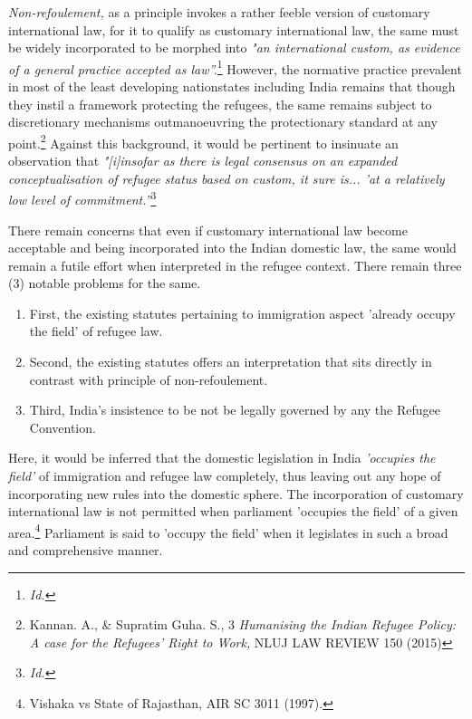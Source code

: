 \begin{multicols}{2}
\noi
\textit{Non-refoulement,} as a principle invokes a rather feeble version of customary international
law, for it to qualify as customary international law, the same must be widely incorporated to
be morphed into \textit{"an international custom, as evidence of a general practice accepted as
law”.}\footnote{\textit{Id.}} However, the normative practice prevalent in most of the least developing nationstates including India remains that though they instil a framework protecting the refugees, the
same remains subject to discretionary mechanisms outmanoeuvring the protectionary
standard at any point.\footnote{Kannan. A., \& Supratim Guha. S., 3 \textit{Humanising the Indian Refugee Policy: A case for the Refugees’ Right to Work,} NLUJ LAW REVIEW 150 (2015)} Against this background, it would be pertinent to insinuate an observation that \textit{"[i]insofar as there is legal consensus on an expanded conceptualisation of
refugee status based on custom, it sure is... 'at a relatively low level of commitment.”}\footnote{\textit{Id.}}


\noi
There remain concerns that even if customary international law become acceptable and being
incorporated into the Indian domestic law, the same would remain a futile effort when
interpreted in the refugee context. There remain three (3) notable problems for the same.

\begin{enumerate}[label=$\bullet$]
\item First, the existing statutes pertaining to immigration aspect 'already occupy the field'
of refugee law.

\item Second, the existing statutes offers an interpretation that sits directly in contrast with
principle of non-refoulement.

\item Third, India’s insistence to be not be legally governed by any the Refugee
Convention.
\end{enumerate}

\noi
Here, it would be inferred that the domestic legislation in India \textit{'occupies the field'} of
immigration and refugee law completely, thus leaving out any hope of incorporating new
rules into the domestic sphere. The incorporation of customary international law is not
permitted when parliament 'occupies the field' of a given area.\footnote{Vishaka vs State of Rajasthan, AIR SC 3011 (1997).} Parliament is said to 'occupy the field' when it legislates in such a broad and comprehensive manner.


\end{multicols}
